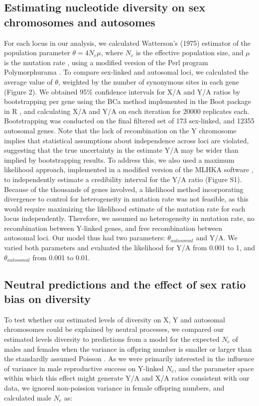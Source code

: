 \documentclass[9pt,twocolumn,twoside]{gsajnl}
\begin{document}
\subsection*{Estimating nucleotide diversity on sex chromosomes and autosomes}
For each locus in our analysis, we calculated Watterson's (1975) estimator of the population parameter $\theta=4N_{e}\mu$, where $N_{e}$ is the effective population size, and $\mu$ is the mutation rate \citep{watterson1975}, using a modified version of the Perl program Polymorphurama \citep{bachtrog2006}. To compare sex-linked and autosomal loci, we calculated the average value of $\theta$, weighted by the number of synonymous sites in each gene (\X Figure 2). We obtained 95\% confidence intervals for X/A and Y/A ratios by bootstrapping per gene using the BCa method \citep{efron1994} implemented in the Boot package in R \citep{canty2012boot}, and calculating X/A and Y/A on each iteration for 20000 replicates each. Bootstrapping was conducted on the final filtered set of 173 sex-linked, and 12355 autosomal genes. Note that the lack of recombination on the Y chromosome implies that statistical assumptions about independence across loci are violated, suggesting that the true uncertainty in the estimate Y/A may be wider than implied by bootstrapping results. To address this, we also used a maximum likelihood approach, implemented in a modified version of the MLHKA software \citep{wright2004hka}, to independently estimate a credibility interval for the Y/A ratio (Figure S1). Because of the thousands of genes involved, a likelihood method incorporating divergence to control for heterogeneity in mutation rate was not feasible, as this would require maximizing the likelihood estimate of the mutation rate for each locus independently. Therefore, we assumed no heterogeneity in mutation rate, no recombination between Y-linked genes, and free recombination between autosomal loci. Our model thus had two parameters: $\theta_{autosomal}$ and Y/A. We varied both parameters and evaluated the likelihood for Y/A from 0.001 to 1, and $\theta_{autosomal}$ from 0.001 to 0.01.

\subsection*{Neutral predictions and the effect of sex ratio bias on diversity}
To test whether our estimated levels of diversity on X, Y and autosomal chromosomes could be explained by neutral processes, we compared our estimated levels diversity to predictions from a model for the expected $N_{e}$ of males and females when the variance in offpring number is smaller or larger than the standardly assumed Poisson \citep{kimura1964number, hedrick2011genetics}. As we were primarily interested in the influence of variance in male reproductive success on Y-linked $N_{e}$, and the parameter space within which this effect might generate Y/A and X/A ratios consistent with our data, we ignored non-poission variance in female offspring numbers, and calculated male $N_{e}$ as:
\end{document}
